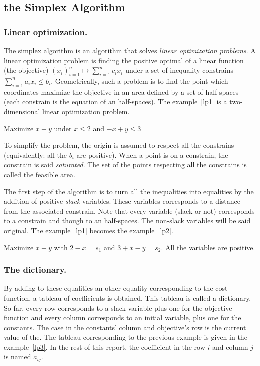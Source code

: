 \subsection{the Simplex Algorithm}
\subsubsection{Linear optimization.}
The simplex algorithm is an algorithm that solves \emph{linear optimization problems}. A linear optimization problem is finding the positive optimal of a linear function (the objective) $(x_i)_{i=1}^n \mapsto \sum_{i=1}^n c_i x_i$  under a set of inequality constrains $\sum_{i=1}^n a_i x_i \leq b_i$. Geometrically, such a problem is to find the point which coordinates maximize the objective in an area defined by a set of half-spaces (each constrain is the equation of an half-spaces). The example~\ref{lp1} is a two-dimensional linear optimization problem.

\begin{example}
	Maximize $x+y$ under $x\leq 2$ and $-x+y\leq 3$
	\label{lp1}
\end{example}

To simplify the problem, the origin is assumed to respect all the constrains (equivalently: all the $b_i$ are positive). When a point is on a constrain, the constrain is said \emph{saturated}. The set of the points respecting all the constrains is called the feasible area. 

The first step of the algorithm is to turn all the inequalities into equalities by the addition of positive \emph{slack} variables. These variables corresponds to a distance from the associated constrain. Note that every variable (slack or not) corresponds to a constrain and though to an half-spaces. The non-slack variables will be said original. The example~\ref{lp1} becomes the example~\ref{lp2}.

\begin{example}
	Maximize $x+y$ with $2-x=s_1$ and $3+x-y=s_2$. All the variables are positive.
	\label{lp2}
\end{example}
\subsubsection{The dictionary.}
By adding to these equalities an other equality corresponding to the cost function, a tableau of coefficients is obtained. This tableau is called a dictionary. So far, every row corresponds to a slack variable plus one for the objective function and every column corresponds to an initial variable, plus one for the constants. The case in the constants' column and objective's row is the current value of the. The tableau corresponding to the previous example is given in the example~\ref{lp3}. In the rest of this report, the coefficient in the row $i$ and column $j$ is named $a_{ij}$.

